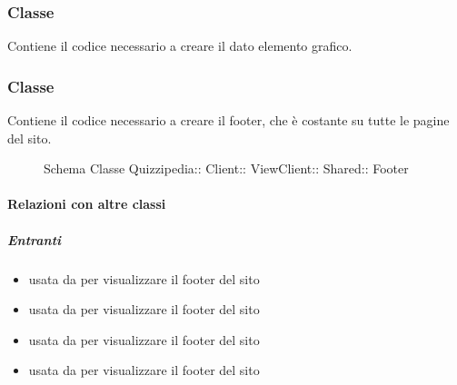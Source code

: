 \subsubsection{Classe }
Contiene il codice necessario a creare il dato elemento grafico.
\subsubsection{Classe }
Contiene il codice necessario a creare il footer, che è costante su tutte le pagine del sito.
\begin{figure}[H]
\centering
\noindent{}
\caption[Schema Classe Footer]{Schema Classe Quizzipedia:: Client:: ViewClient:: Shared:: Footer}
\end{figure}
\paragraph{Relazioni con altre classi}
\subparagraph{Entranti}
\begin{itemize}
\item usata da  per visualizzare il footer del sito
\item usata da  per visualizzare il footer del sito
\item usata da  per visualizzare il footer del sito
\item usata da  per visualizzare il footer del sito
\end{itemize}
